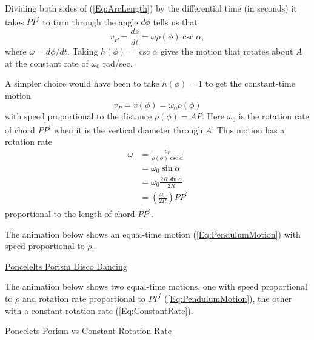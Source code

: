 \documentclass{ximera}
\begin{document}
Dividing both sides of (\ref{Eq:ArcLength}) by the differential time (in seconds) it takes $\overline{PP^\prime}$ to turn through the angle $d\phi$ tells us that 
\begin{equation}
    v_P = \frac{ds}{dt} = \omega \rho (\phi) \csc \alpha ,  \label{Eq:ConstantRate}
\end{equation}
where $\omega  = d\phi/dt$. Taking $h(\phi) = \csc \alpha$ gives the motion that rotates about $A$ at the constant rate of $\omega_0$ rad/sec.

A simpler choice would have been to take $h(\phi)=1$ to get the constant-time motion                  %
\begin{equation}
   v_P =   v(\phi) = \omega_0 \rho(\phi) \label{Eq:PendulumMotion} 
\end{equation}
with speed proportional to the distance $\rho(\phi) = AP$. Here $\omega_0$ is the rotation rate of chord $\overline{PP^\prime}$ when it is the vertical diameter through $A$. This motion has a rotation rate %
\begin{align*}
     \omega &= \frac{v_P}{\rho (\phi) \csc \alpha} \\
                 &= \omega_0 \sin\alpha  \\
                  & = \omega_0 \frac{2R \sin\alpha}{2R}  \\
                  &=  \left( \frac{\omega_0}{2R}\right) PP^\prime 
\end{align*}
proportional to the length of chord $\overline{PP^\prime}$.

\begin{exploration}
The animation below shows an equal-time motion (\ref{Eq:PendulumMotion}) with speed proportional to $\rho$.
\begin{onlineOnly}
    \begin{center}
\end{center}
\end{onlineOnly}

\href{https://www.desmos.com/calculator/g2o1szpkh5}{Poncelelts Porism Disco Dancing}
\end{exploration}


\begin{exploration}
The animation below shows two equal-time motions, one with speed proportional to $\rho$ and rotation rate proportional to $PP^\prime$ (\ref{Eq:PendulumMotion}), the other with a constant rotation rate (\ref{Eq:ConstantRate}). 
\begin{onlineOnly}
    \begin{center}
\end{center}
\end{onlineOnly}

\href{https://www.desmos.com/calculator/xifdeg3wsq}{Poncelets Porism vs Constant Rotation Rate}

\end{exploration}
\end{document}
